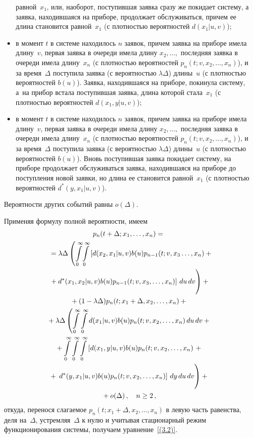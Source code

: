 \begin{multicols}{2}
\begin{itemize}
равной~$x_1$, или, наоборот, поступившая
заявка сразу же покидает сис\-те\-му, а заявка,
находившаяся на приборе, продолжает
обслуживаться, причем ее длина становится
равной~$x_1$ (с плотностью
вероятностей $d(x_1|u,v)$);
\item
в момент $t$ в сис\-те\-ме находилось $n$ заявок,
причем заявка на приборе имела длину~$v$,
первая заявка в очереди имела длину
$x_2,\ldots,$ последняя заявка в очереди
имела длину~$x_n$ (с плотностью вероятностей
$p_n(t;v,x_2,\ldots,x_n)$), и за время~$\Delta$
поступила заявка (с вероятностью $\lambda\Delta$) длины~$u$
(с плотностью вероятностей $b(u)$).
Заявка, находившаяся на приборе, покинула
сис\-те\-му, а~на прибор встала поступившая
заявка, длина которой стала~$x_1$ (с
плотностью вероятностей $d(x_1,y|u,v)$);
\item
в момент $t$ в сис\-те\-ме находилось $n$ заявок,
причем заявка на приборе имела длину~$v$,
первая заявка в очереди имела длину
$x_2,\ldots,$ последняя заявка в очереди
имела длину~$x_n$ (с плотностью вероятностей
$p_n(t;v,x_2,\ldots,x_n)$), и за время~$\Delta$ поступила заявка (с вероятностью
$\lambda\Delta$) длины~$u$ (с плотностью
вероятностей $b(u)$).
Вновь поступившая заявка покидает сис\-те\-му,
на приборе продолжает обслуживаться заявка,
на\-хо\-див\-шая\-ся на приборе до поступления новой
заявки, но длина ее становится равной~$x_1$
(с плотностью вероятностей $d^*(y,x_1|u,v)$).
\end{itemize}
Вероятности других событий равны $o(\Delta)$.

Применяя формулу полной вероятности, имеем
\begin{multline*}
p_{n}(t+\Delta;x_1,\ldots,x_n)
={}\\
{}= \lambda\Delta \left(
\int\limits_0^\infty \!\int\limits_0^\infty
\left[d(x_2,x_1|u,v) b(u) p_{n-1}(t;v,x_3\ldots,x_n)
+{}\right.\right.\hspace*{-8pt}\\
\left.\left.{}+
d^*(x_1,x_2|u,v) b(u) p_{n-1}(t;v,x_3,\ldots,x_n)\right]
\,du\,dv \vphantom{\int\limits_0^\infty}\right)
+ {}\\
{}+
(1-\lambda\Delta) p_{n}(t;x_1+\Delta,x_2,\ldots,x_n)
+ {}\\
{}+\lambda\Delta \left(
\int\limits_0^\infty \int\limits_0^\infty
d(x_1|u,v) b(u) p_{n}(t;v,x_2,\ldots,x_n)
\,du\,dv + {}\right.\hspace*{-1.28279pt}\\
{}+
\int\limits_0^\infty \int\limits_0^\infty
\int\limits_0^\infty \left[d(x_1,y|u,v) b(u) p_{n}(t;v,x_2,\ldots,x_n)\right.
+{}\\
{}+
\left.\left.d^*(y,x_1|u,v) b(u) p_{n}(t;v,x_2,\ldots,x_n)\right]
\,dy\,du\,dv \vphantom{\int\limits_0^\infty}
\right)+{}\\
{}+o(\Delta)\,, \quad n\ge 2\,,
\end{multline*}
откуда, перенося слагаемое
$p_n(t;x_1+\Delta,x_2,\ldots,x_{n})$ в
левую часть равенства, деля на~$\Delta$,
устремляя~$\Delta$ к нулю и учитывая
стационарный режим функционирования сис\-те\-мы,
получаем уравнение~\eqref{(3.2)}.


\end{multicols}
